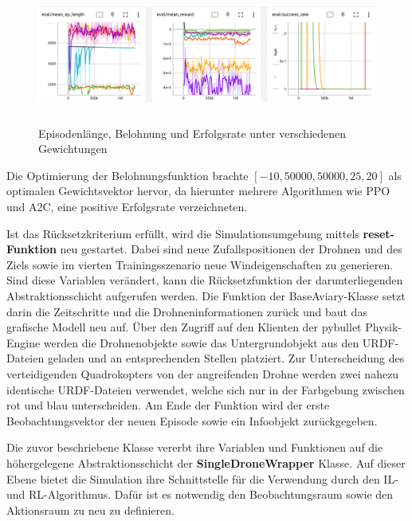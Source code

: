 \begin{figure}[htb]
    \centering
    \includegraphics[height=4.5cm]{lib/graphics/speed_reward_logs.png}
    \caption[Episodenlänge, Belohnung und Erfolgsrate unter verschiedenen Gewichtungen]{Episodenlänge, Belohnung und Erfolgsrate unter verschiedenen Gewichtungen\footnotemark}
    \label{abb:reward-logs}
\end{figure}

Die Optimierung der Belohnungsfunktion brachte $[-10, 50000, 50000, 25, 20]$ als optimalen Gewichtsvektor hervor, da hierunter mehrere Algorithmen wie PPO und A2C, eine positive Erfolgsrate verzeichneten.

Ist das Rücksetzkriterium erfüllt, wird die Simulationsumgebung mittels \textbf{reset-Funktion} neu gestartet.
Dabei sind neue Zufallspositionen der Drohnen und des Ziels sowie im vierten Trainingsszenario neue Windeigenschaften zu generieren.
Sind diese Variablen verändert, kann die Rücksetzfunktion der darunterliegenden Abstraktionsschicht aufgerufen werden.
Die Funktion der BaseAviary-Klasse setzt darin die Zeitschritte und die Drohneninformationen zurück und baut das grafische Modell neu auf.
Über den Zugriff auf den Klienten der pybullet Physik-Engine werden die Drohnenobjekte sowie das Untergrundobjekt aus den URDF-Dateien geladen und an entsprechenden Stellen platziert.
Zur Unterscheidung des verteidigenden Quadrokopters von der angreifenden Drohne werden zwei nahezu identische URDF-Dateien verwendet, welche sich nur in der Farbgebung zwischen rot und blau unterscheiden.
Am Ende der Funktion wird der erste Beobachtungsvektor der neuen Episode sowie ein Infoobjekt zurückgegeben.

Die zuvor beschriebene Klasse vererbt ihre Variablen und Funktionen auf die höhergelegene Abstraktionsschicht der \textbf{SingleDroneWrapper} Klasse.
Auf dieser Ebene bietet die Simulation ihre Schnittstelle für die Verwendung durch den IL- und RL-Algorithmus.
Dafür ist es notwendig den Beobachtungsraum sowie den Aktionsraum zu neu zu definieren.

